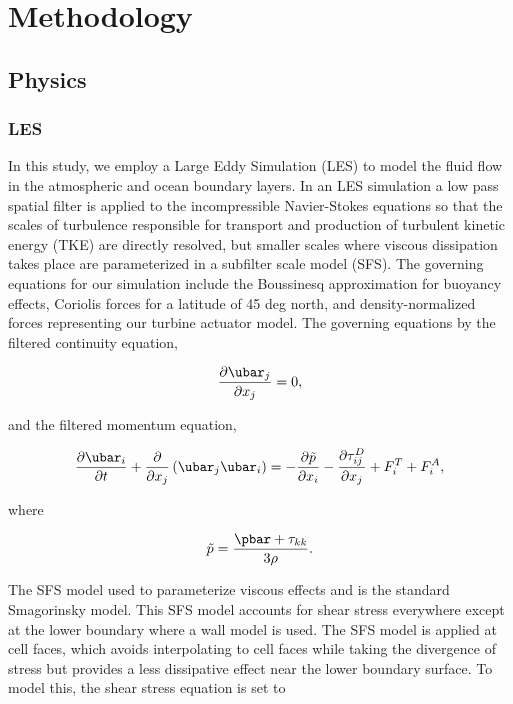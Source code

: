 \section{Methodology}

\subsection{Physics}


\subsubsection{LES}
In this study, we employ a Large Eddy Simulation (LES) to model the fluid flow in the atmospheric and ocean boundary layers.  In an LES simulation a low pass spatial filter is applied to the incompressible Navier-Stokes equations so that the scales of turbulence responsible for transport and production of turbulent kinetic energy (TKE) are directly resolved, but smaller scales where viscous dissipation takes place are parameterized in a subfilter scale model (SFS).  The governing equations for our simulation include the Boussinesq approximation for buoyancy effects, Coriolis forces for a latitude of 45 deg north, and density-normalized forces representing our turbine actuator model.  The governing equations by the filtered continuity equation,

\begin{equation}
   \label{filtered_continuity}
   \frac{\partial \ubar_j}{\partial x_j} = 0,
\end{equation}

and the filtered momentum equation,

\begin{equation}
   \label{filtered_momentum}
   \frac{\partial \ubar_i}{\partial t} + \frac{\partial}{\partial x_j}\left(\ubar_j \ubar_i \right)
   = - \frac{\partial \tilde{p}}{\partial x_i} - \frac{\partial \tau^D_{ij}}{\partial x_j} + F^T_i + F^A_i,
\end{equation}

where

\begin{equation}
   \label{eq:modified_pressure}
   \tilde{p} = \frac{\pbar + \tau_{kk}}{3 \rho}.
\end{equation}

The SFS model used to parameterize viscous effects and is the standard Smagorinsky model.  This SFS model accounts for shear stress everywhere except at the lower boundary where a wall model is used.  The SFS model is applied at cell faces, which avoids interpolating to cell faces while taking the divergence of stress but provides a less dissipative effect near the lower boundary surface.  To model this, the shear stress equation is set to

